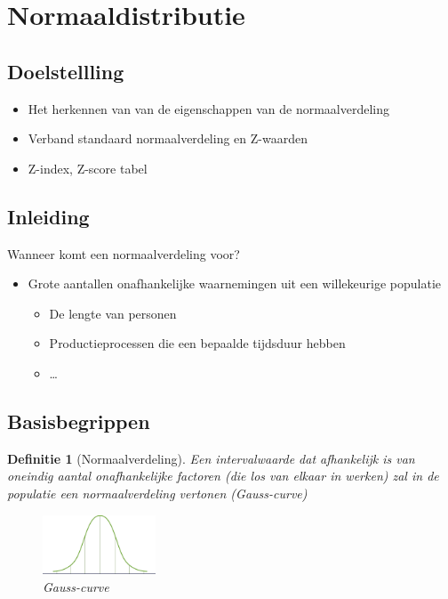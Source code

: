 \documentclass{article}
\newtheorem{theorem}{Definitie}[section]
\begin{document}
\section{Normaaldistributie}

\subsection{Doelstellling}

\begin{itemize}
    \item Het herkennen van van de eigenschappen van de normaalverdeling
    \item Verband standaard normaalverdeling en Z-waarden
    \item Z-index, Z-score tabel
\end{itemize}

\subsection{Inleiding}

Wanneer komt een normaalverdeling voor?

\begin{itemize}
    \item Grote aantallen onafhankelijke waarnemingen uit een willekeurige populatie
    \begin{itemize}
        \item De lengte van personen
        \item Productieprocessen die een bepaalde tijdsduur hebben
        \item \dots
    \end{itemize}
\end{itemize}

\subsection{Basisbegrippen}

\begin{theorem}[Normaalverdeling]
    Een intervalwaarde dat afhankelijk is van oneindig aantal onafhankelijke factoren (die los van elkaar in werken)
    zal in de populatie een normaalverdeling vertonen (Gauss-curve)

    \begin{figure}[H]
        \centering
        \includegraphics[width=0.3\textwidth]{gauss.png}
        \caption{Gauss-curve}
    \end{figure}
\end{theorem}
\end{document}
